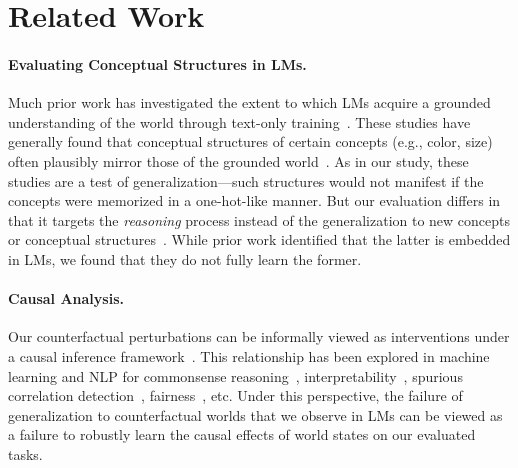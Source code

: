 \section{Related Work}

\paragraph{Evaluating Conceptual Structures in LMs.}
Much prior work has investigated the extent to which LMs acquire a grounded understanding of the world through text-only training~. These studies have generally found that conceptual structures of certain concepts (e.g., color, size)  often plausibly mirror those of the grounded world~\citep{abdou-etal-2021-language, patel2022mapping,mollo2023vector}. As in our study, these studies are a test of  generalization---such structures would not manifest if the concepts were memorized in a one-hot-like manner. But our evaluation differs in that it targets the \emph{reasoning} process instead of the generalization to new concepts or conceptual structures~\citep{kondo2023probing}. While prior work identified that the latter is embedded in LMs, we found that they do not fully learn the former.

\paragraph{Causal Analysis.}
Our counterfactual perturbations can be informally viewed as interventions under a causal inference framework~\citep{pearl_2009}. This relationship has been explored in machine learning and NLP for commonsense reasoning~\citep{kıcıman2023causal}, interpretability~\citep{elazar-etal-2021-amnesic,geiger2021causal,geiger22a}, spurious correlation detection~\citep{veitch2021counterfactual,eisenstein-2022-informativeness}, fairness~\citep{kusner2017counterfactual,nabi18fair}, etc.
Under this perspective, the failure  of generalization to counterfactual worlds that we observe in LMs can be viewed as a failure to robustly learn the causal effects of world states on our evaluated tasks.


